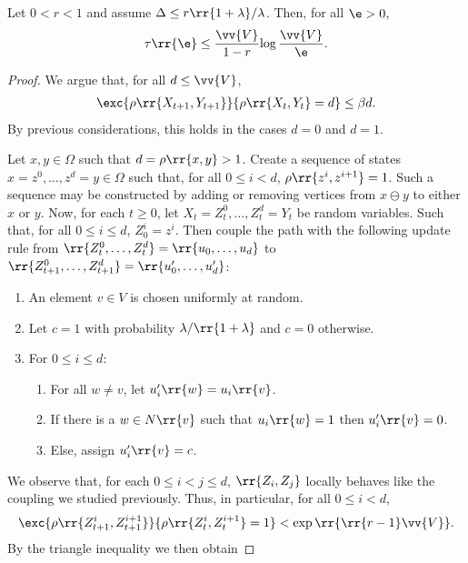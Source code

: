 \documentclass{article}
\begin{document}
\begin{claim*}[5]
  Let $0<r<1$ and assume $\Delta\leq r\rr{1+\lambda}/\lambda$. Then, for all $\e>0$,
  \begin{align*}
    \tau\rr{\e}\leq \frac{\vv{V}}{1-r}{\log\frac{\vv{V}}{\e}}.
  \end{align*}
  \begin{proof}
    We argue that, for all $d\leq\vv{V}$,
    \begin{align*}
      \exc{\rho\rr{X_{t+1},Y_{t+1}}}{\rho\rr{X_t,Y_t}=d}\leq \beta d.
    \end{align*}
    By previous considerations, this holds in the cases $d=0$ and $d=1$.

    Let $x,y\in\Omega$ such that $d=\rho\rr{x,y}>1$. Create a sequence of states
    $x=z^0,\ldots,z^d=y\in\Omega$ such that, for all $0\leq i<d$, $\rho\rr{z^i,z^{i+1}}=1$.
    Such a sequence may be constructed by adding or removing vertices from $x\ominus y$ to
    either $x$ or $y$. Now, for each $t\geq 0$, let $X_t=Z_t^0,\ldots,Z_t^d=Y_t$ be random
    variables. Such that, for all $0\leq i\leq d$, $Z_0^i=z^i$. Then couple the path
    with the following update rule from $\rr{Z_t^0,\ldots,Z_t^d}=\rr{u_0,\ldots,u_d}$
    to $\rr{Z_{t+1}^0,\ldots,Z_{t+1}^d}=\rr{u'_0,\ldots,u'_d}$:
    \begin{enumerate}
      \item An element $v\in V$ is chosen uniformly at random.
      \item Let $c=1$ with probability $\lambda/\rr{1+\lambda}$ and $c=0$ otherwise.
      \item For $0\leq i\leq d$:
        \begin{enumerate}
          \item For all $w\neq v$, let $u'_i\rr{w}=u_i\rr{v}$.
          \item If there is a $w\in N\rr{v}$ such that $u_i\rr{w}=1$ then $u'_i\rr{v}=0$.
          \item Else, assign $u'_i\rr{v}=c$.
        \end{enumerate}
    \end{enumerate}
    We observe that, for each $0\leq i<j\leq d$, $\rr{Z_i,Z_j}$ locally behaves like the coupling we studied
    previously. Thus, in particular, for all $0\leq i<d$,
    \begin{align*}
      \exc{\rho\rr{Z_{t+1}^i,Z_{t+1}^{i+1}}}{\rho\rr{Z_t^i,Z_t^{i+1}}=1}<\exp\rr{\rr{r-1}\vv{V}}.
    \end{align*}
    By the triangle inequality we then obtain

\end{proof}
\end{claim*}
\end{document}
